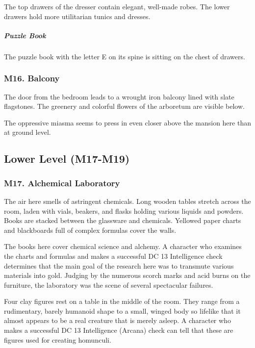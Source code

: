 \documentclass[10pt,a4paper,twoside,bg=print,twocolumn,openany,nodeprecatedcode]{dndbook}
\begin{document}
The top drawers of the dresser contain elegant, well-made robes. The lower drawers hold more utilitarian tunics and dresses.

\subparagraph{Puzzle Book}
The puzzle book with the letter E on its spine is sitting on the chest of drawers.

\subsubsection{M16. Balcony}
\begin{DndReadAloud}{}
The door from the bedroom leads to a wrought iron balcony lined with slate flagstones. The greenery and colorful flowers of the arboretum are visible below.

\end{DndReadAloud}

The oppressive miasma seems to press in even closer above the mansion here than at ground level.

\subsection{Lower Level (M17-M19)}
\subsubsection{M17. Alchemical Laboratory}
\begin{DndReadAloud}{}
The air here smells of astringent chemicals. Long wooden tables stretch across the room, laden with vials, beakers, and flasks holding various liquids and powders. Books are stacked between the glassware and chemicals. Yellowed paper charts and blackboards full of complex formulas cover the walls.

\end{DndReadAloud}

The books here cover chemical science and alchemy. A character who examines the charts and formulas and makes a successful DC 13 Intelligence check determines that the main goal of the research here was to transmute various materials into gold. Judging by the numerous scorch marks and acid burns on the furniture, the laboratory was the scene of several spectacular failures.

Four clay figures rest on a table in the middle of the room. They range from a rudimentary, barely humanoid shape to a small, winged body so lifelike that it almost appears to be a real creature that is merely asleep. A character who makes a successful DC 13 Intelligence (Arcana) check can tell that these are figures used for creating homunculi.
\end{document}
